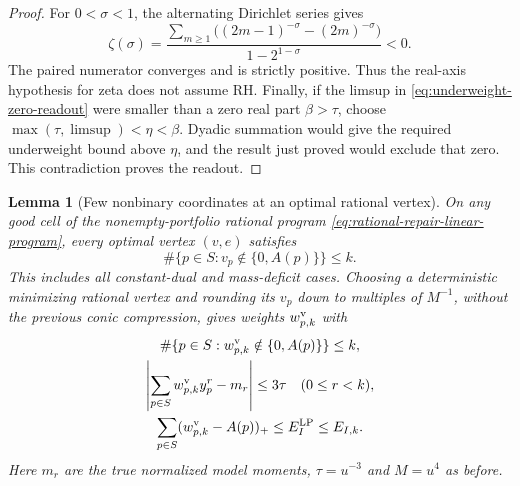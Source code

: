 \documentclass[11pt]{article}
\newtheorem{lemma}[theorem]{Lemma}
\theoremstyle{definition}
\begin{document}
\begin{proof}
For $0<\sigma<1$, the alternating Dirichlet series gives
\[
 \zeta(\sigma)=
 \frac{\sum_{m\ge1}\bigl((2m-1)^{-\sigma}-(2m)^{-\sigma}\bigr)}
                 {1-2^{1-\sigma}}<0 .
\]
The paired numerator converges and is strictly positive.
Thus the real-axis hypothesis for zeta does not assume RH.
Finally, if the limsup in
\eqref{eq:underweight-zero-readout} were smaller than a zero
real part $\beta>\tau$, choose
$\max(\tau,\limsup)<\eta<\beta$.
Dyadic summation would give the required underweight bound
above $\eta$, and the result just proved would exclude that
zero. This contradiction proves the readout.
\end{proof}

\begin{lemma}[Few nonbinary coordinates at an optimal rational vertex]
\label{lem:rational-LP-binary-vertex}
On any good cell of the nonempty-portfolio rational program
\eqref{eq:rational-repair-linear-program}, every optimal
vertex $(v,e)$ satisfies
\begin{equation}
 \#\{p\in S:v_p\notin\{0,A(p)\}\}\le k.
 \label{eq:rational-LP-vertex-sparsity}
\end{equation}
This includes all constant-dual and mass-deficit cases.
Choosing a deterministic minimizing rational vertex and
rounding its $v_p$ down to multiples of $M^{-1}$, without
the previous conic compression, gives weights $w^{\rm v}_{p,k}$
with
\begin{equation}
 \begin{gathered}
 \#\{p\in S:w^{\rm v}_{p,k}\notin\{0,A(p)\}\}\le k,\\
 \left|\sum_{p\in S}w^{\rm v}_{p,k}y_p^r-m_r\right|
                               \le3\tau\quad(0\le r<k),\\
 \sum_{p\in S}(w^{\rm v}_{p,k}-A(p))_+
           \le E_I^{\rm LP}\le E_{I,k}.
 \end{gathered}
 \label{eq:rational-LP-rounded-binary}
\end{equation}
Here $m_r$ are the true normalized model moments,
$\tau=u^{-3}$ and $M=u^4$ as before.
\end{lemma}
\end{document}

